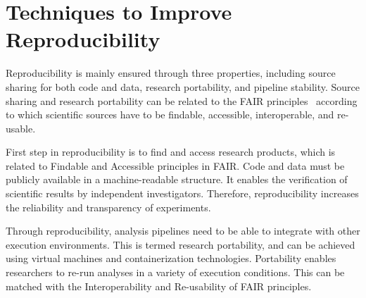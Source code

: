 

\section{Techniques to Improve Reproducibility}
\label{techniques}

Reproducibility is mainly ensured through three properties, including 
source sharing for both code and data, 
research portability, and pipeline 
stability. Source sharing and research portability can be related to 
the FAIR principles~\cite{wilkinson2016fair} according to which 
scientific sources have to be findable, accessible, interoperable, and 
re-usable. 

First step in reproducibility is to find and access research products, 
which is related to Findable and Accessible principles in FAIR. 
Code and data must be publicly available in a 
machine-readable structure. It enables the verification of scientific 
results by independent investigators. Therefore, reproducibility 
increases the reliability and transparency of experiments. 

Through reproducibility, analysis pipelines need to be able to 
integrate with other execution environments. This is termed research 
portability, and can be achieved using virtual machines and 
containerization technologies. Portability enables researchers to 
re-run analyses in a variety of execution conditions. This can be 
matched with the Interoperability and Re-usability of FAIR principles. 

